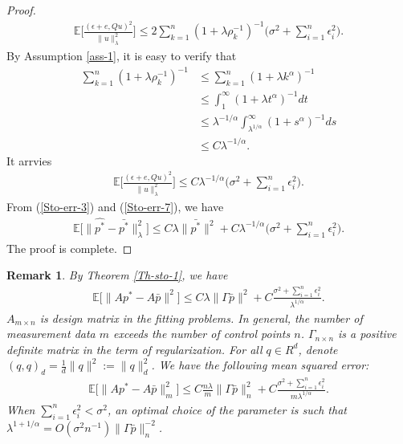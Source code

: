 \documentclass[11pt]{article}
\newtheorem{remark}{Remark}[section]
\numberwithin{equation}{section}
\begin{document}
\begin{proof}
\begin{align*}
\mathbb{E}\bigg[\frac{(\epsilon+e,Qu)^2}{\| u\|_{\lambda}^2}\bigg]
\leq 2\sum_{k=1}^n(1+\lambda\rho_k^{-1})^{-1}\bigg(\sigma^2+\sum_{i=1}^n\epsilon_i^2\bigg).
\end{align*}
By Assumption \ref{ass-1}, it is easy to verify that
\begin{align*}
\sum_{k=1}^n(1+\lambda\rho_k^{-1})^{-1}
&\leq \sum_{k=1}^n(1+\lambda k^{\alpha})^{-1}\\
&\leq \int_1^{\infty}(1+\lambda t^{\alpha})^{-1}dt\\
&\leq \lambda^{-1/\alpha}\int_{\lambda^{1/\alpha}}^{\infty}(1+ s^{\alpha})^{-1}ds\\
&\leq C\lambda^{-1/\alpha}.
\end{align*}
It arrvies 
\begin{align}\label{Sto-err-7}
\mathbb{E}\bigg[\frac{(\epsilon+e,Qu)^2}{\| u\|_{\lambda}^2}\bigg]
\leq C\lambda^{-1/\alpha}\bigg(\sigma^2+\sum_{i=1}^n\epsilon_i^2\bigg).
\end{align}
From (\ref{Sto-err-3}) and (\ref{Sto-err-7}), we have
\begin{align*}
\mathbb{E}\big[\| \hat{p^*}-\bar{p^*}\|_{\lambda}^2\big]\leq C\lambda\|\bar{p^*}\|^2+C\lambda^{-1/\alpha}\bigg(\sigma^2+\sum_{i=1}^n\epsilon_i^2\bigg).
\end{align*}
The proof is complete. 
\end{proof} 

\begin{remark}
By Theorem \ref{Th-sto-1}, we have
\begin{align*}
\mathbb{E}\big[\|Ap^*-A\bar{p}\|^2\big]\leq C\lambda\|\Gamma\bar{p}\|^2+C\frac{\sigma^2+\sum_{i=1}^n\epsilon_i^2}{\lambda^{1/\alpha}}.
\end{align*}
$A_{m\times n}$ is design matrix in the fitting problems. In general, the number of measurement data $m$ exceeds the number of control points $n$. $\Gamma_{n\times n}$ is a positive definite matrix in the term of regularization. For all $q\in R^d$, denote $(q,q)_d=\frac{1}{d}\|q\|^2:=\|q\|_d^2$. We have the following mean squared error:
\begin{align*}
\mathbb{E}\big[\|Ap^*-A\bar{p}\|_m^2\big]\leq C\frac{n\lambda}{m}\|\Gamma\bar{p}\|_n^2+C\frac{\sigma^2+\sum_{i=1}^n\epsilon_i^2}{m\lambda^{1/\alpha}}.
\end{align*}
When $\sum_{i=1}^n\epsilon_i^2<\sigma^2$, an optimal choice of the parameter is such that $\lambda^{1+1/\alpha}=O(\sigma^2n^{-1})\|\Gamma\bar{p}\|_n^{-2}$.
\end{remark}
\end{document}
